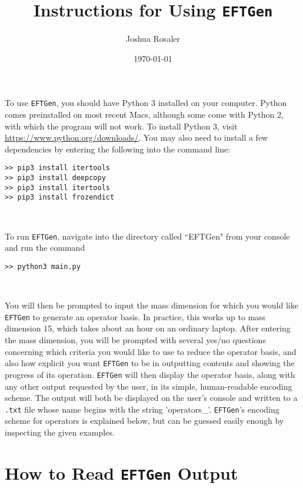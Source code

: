 \documentclass[11pt,BCOR=5mm]{article}
\title{Instructions for Using \texttt{EFTGen}}
\author{Joshua Rosaler}
\date{\today}
\begin{document}
\maketitle


To use \texttt{EFTGen}, you should have Python 3 installed on your computer. Python comes preinstalled on most recent Macs, although some come with Python 2, with which the program will not work. To install Python 3, visit \href{https://www.python.org/downloads/}{https://www.python.org/downloads/}. You may also need to install a few dependencies by entering the following into the command line:

\begin{lstlisting}[numbers=none, xleftmargin=.00\textwidth]
>> pip3 install itertools
>> pip3 install deepcopy
>> pip3 install itertools
>> pip3 install frozendict
\end{lstlisting}

\

\noindent To run \texttt{EFTGen}, navigate into the directory called ``EFTGen" from your console and run the command 

{\center
\begin{lstlisting}[numbers=none, xleftmargin=.00\textwidth]
>> python3 main.py
\end{lstlisting}
}

\

\noindent You will then be prompted to input the mass dimension for which you would like \texttt{EFTGen} to generate an operator basis. In practice, this works up to mass dimension 15, which takes about an hour on an ordinary laptop. After entering the mass dimension, you will be prompted with several yes/no questions concerning which criteria you would like to use to reduce the operator basis, and also how explicit you want  \texttt{EFTGen} to be in outputting contents and showing the progress of its operation.  \texttt{EFTGen} will then display the operator basis, along with any other output requested by the user, in its simple, human-readable encoding scheme. The output will both be displayed on the user's console and written to a \texttt{.txt} file whose name begins with the string 'operators\_'.   \texttt{EFTGen}'s encoding scheme for operators is explained below, but can be guessed easily enough by inspecting the given examples. 

\section{How to Read \texttt{EFTGen} Output}
\end{document}
